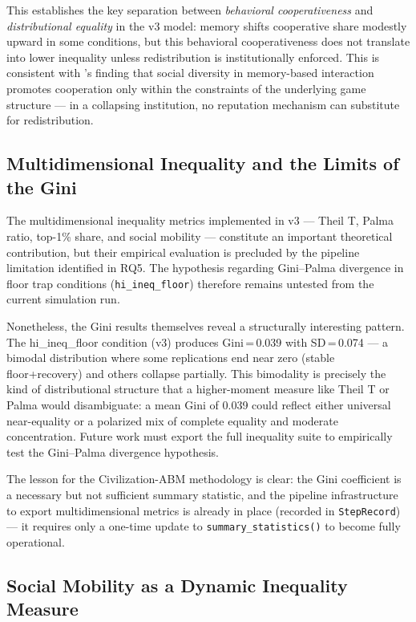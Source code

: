 \documentclass[12pt, letterpaper]{article}
\begin{document}
This establishes the key separation between \emph{behavioral
cooperativeness} and \emph{distributional equality} in the v3 model:
memory shifts cooperative share modestly upward in some conditions,
but this behavioral cooperativeness does not translate into lower
inequality unless redistribution is institutionally enforced. This is
consistent with \citet{santos2008social}'s finding that social
diversity in memory-based interaction promotes cooperation only within
the constraints of the underlying game structure --- in a collapsing
institution, no reputation mechanism can substitute for redistribution.

\subsection{Multidimensional Inequality and the Limits of the Gini}

The multidimensional inequality metrics implemented in v3 --- Theil T,
Palma ratio, top-1\% share, and social mobility --- constitute an
important theoretical contribution, but their empirical evaluation is
precluded by the pipeline limitation identified in RQ5. The hypothesis
regarding Gini--Palma divergence in floor trap conditions
(\texttt{hi\_ineq\_floor}) therefore remains untested from the current
simulation run.

Nonetheless, the Gini results themselves reveal a structurally
interesting pattern. The hi\_ineq\_floor condition (v3) produces
Gini\,=\,0.039 with SD\,=\,0.074 --- a bimodal distribution where some
replications end near zero (stable floor+recovery) and others
collapse partially. This bimodality is precisely the kind of
distributional structure that a higher-moment measure like Theil T
or Palma would disambiguate: a mean Gini of 0.039 could reflect
either universal near-equality or a polarized mix of complete equality
and moderate concentration. Future work must export the full inequality
suite to empirically test the Gini--Palma divergence hypothesis.

The lesson for the Civilization-ABM methodology is clear: the Gini
coefficient is a necessary but not sufficient summary statistic, and
the pipeline infrastructure to export multidimensional metrics is
already in place (recorded in \texttt{StepRecord}) --- it requires
only a one-time update to \texttt{summary\_statistics()} to become
fully operational.

\subsection{Social Mobility as a Dynamic Inequality Measure}
\end{document}
